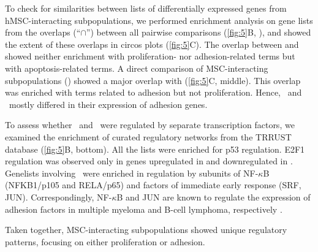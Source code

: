 To check for similarities between lists of differentially expressed genes from
hMSC-interacting subpopulations, we performed enrichment analysis on gene lists
from the overlaps (“$\cap$”) between all pairwise comparisons (\autoref{fig:5}B,
), and showed the extent of these overlaps in
circos plots (\autoref{fig:5}C). The overlap between  and
 showed neither enrichment with proliferation- nor
adhesion-related terms but with apoptosis-related terms. A direct comparison of
MSC-interacting subpopulations () showed a major overlap with
 (\autoref{fig:5}C, middle). This overlap was enriched with terms
related to adhesion but not proliferation. Hence, \MAina\ and \nMAina\ mostly
differed in their expression of adhesion genes.

To assess whether \nMAina\ and \MAina\ were regulated by separate transcription
factors, we examined the enrichment of curated regulatory networks from the
TRRUST database (\autoref{fig:5}B, bottom). All the lists were enriched for p53
regulation. E2F1 regulation was observed only in genes upregulated in
 and downregulated in . Genelists involving
\MAina\ were enriched in regulation by subunits of NF-$\kappa$B (NFKB1/p105 and
RELA/p65) and factors of immediate early response (SRF, JUN). Correspondingly,
NF-$\kappa$B and JUN are known to regulate the expression of adhesion factors in
multiple myeloma and B-cell lymphoma, respectively
\cite{blonskaJunregulatedGenesPromote2015,taiRoleBcellactivatingFactor2006}.

Taken together, MSC-interacting subpopulations showed unique regulatory
patterns, focusing on either proliferation or adhesion.


